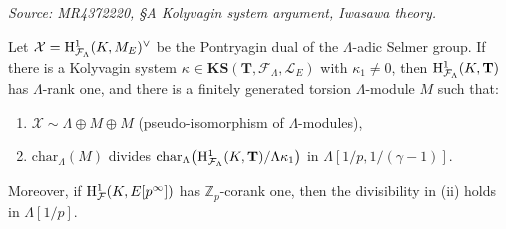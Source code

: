\begin{theorem}
  \label{thm:howard}
  \textit{Source: MR4372220, §A Kolyvagin system argument, Iwasawa theory.}

  Let \(\mathcal{X} = \mathrm{H}^1_{\mathcal{F}_\Lambda}(K, M_E)^\vee\) be the Pontryagin dual of the \(\Lambda\)-adic Selmer group. If there is a Kolyvagin system \(\kappa \in \mathbf{KS}(\mathbf{T}, \mathcal{F}_\Lambda, \mathcal{L}_E)\) with \(\kappa_1 \neq 0\), then \(\mathrm{H}^1_{\mathcal{F}_\Lambda}(K, \mathbf{T})\) has \(\Lambda\)-rank one, and there is a finitely generated torsion \(\Lambda\)-module \(M\) such that:
  \begin{enumerate}
    \item[(i)] \(\mathcal{X} \sim \Lambda \oplus M \oplus M\) (pseudo-isomorphism of \(\Lambda\)-modules),
    \item[(ii)] \(\mathrm{char}_\Lambda(M)\) divides \(\mathrm{char}_\Lambda\bigl(\mathrm{H}^1_{\mathcal{F}_\Lambda}(K, \mathbf{T})/\Lambda\kappa_1\bigr)\) in \(\Lambda[1/p, 1/(\gamma-1)]\).
  \end{enumerate}
  Moreover, if \(\mathrm{H}^1_{\mathcal{F}}(K, E[p^\infty])\) has \(\mathbb{Z}_p\)-corank one, then the divisibility in \textup{(ii)} holds in \(\Lambda[1/p]\).
\end{theorem}

